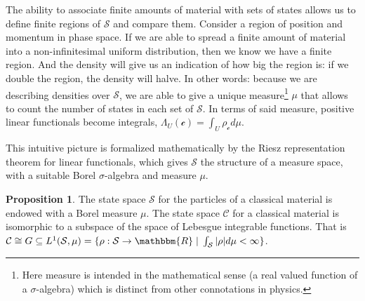 \documentclass[aps,pra,10pt,twocolumn,floatfix,nofootinbib]{revtex4-1}
\numberwithin{equation}{section}
\theoremstyle{definition}
\newtheorem{prop}[equation]{Proposition}
\begin{document}
The ability to associate finite amounts of material with sets of states allows us to define finite regions of $\mathcal{S}$ and compare them. Consider a region of position and momentum in phase space. If we are able to spread a finite amount of material into a non-infinitesimal uniform distribution, then we know we have a finite region. And the density will give us an indication of how big the region is: if we double the region, the density will halve. In other words: because we are describing densities over $\mathcal{S}$, we are able to give a unique measure\footnote{Here measure is intended in the mathematical sense (a real valued function of a $\sigma$-algebra) which is distinct from other connotations in physics.} $\mu$ that allows to count the number of states in each set of $\mathcal{S}$. In terms of said measure, positive linear functionals become integrals, $\Lambda_U (\mathcal{c}) = \int_U \rho_{\mathcal{c}} d \mu$.

This intuitive picture is formalized mathematically by the Riesz representation theorem for linear functionals, which gives $\mathcal{S}$ the structure of a measure space, with a suitable Borel $\sigma$-algebra and measure $\mu$.

\begin{prop}\label{prop:integration}
	The state space $\mathcal{S}$ for the particles of a classical material is endowed with a Borel measure $\mu$. The state space $\mathcal{C}$ for a classical material is isomorphic to a subspace of the space of Lebesgue integrable functions. That is $\mathcal{C} \cong G \subseteq L^1(\mathcal{S}, \mu) = \{ \rho : \mathcal{S} \rightarrow \mathbbm{R} \; | \; \int_{\mathcal{S}} |\rho| d\mu < \infty \}$.
\end{prop}
\end{document}
